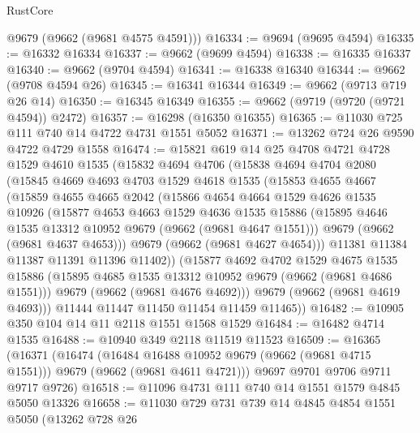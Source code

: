 \begin{lexlean}{RustCore}
\begin{coremodule}
      @9679
      (@9662 (@9681 @4575 @4591)))
@16334 := @9694 (@9695 @4594)
@16335 := @16332 @16334
@16337 := @9662 (@9699 @4594)
@16338 := @16335 @16337
@16340 := @9662 (@9704 @4594)
@16341 := @16338 @16340
@16344 := @9662 (@9708 @4594 @26)
@16345 := @16341 @16344
@16349 := @9662 (@9713 @719 @26 @14)
@16350 := @16345 @16349
@16355 := @9662 (@9719 (@9720 (@9721 @4594)) @2472)
@16357 := @16298 (@16350 @16355)
@16365 := @11030 @725 @111 @740 @14 @4722 @4731 @1551 @5052
@16371 := @13262 @724 @26 @9590 @4722 @4729 @1558
@16474 := @15821
    @619
    @14
    @25
    @4708
    @4721
    @4728
    @1529
    @4610
    @1535
    (@15832
      @4694
      @4706
      (@15838
        @4694
        @4704
        @2080
        (@15845
          @4669
          @4693
          @4703
          @1529
          @4618
          @1535
          (@15853
            @4655
            @4667
            (@15859
              @4655
              @4665
              @2042
              (@15866
                @4654
                @4664
                @1529
                @4626
                @1535
                @10926
                (@15877
                  @4653
                  @4663
                  @1529
                  @4636
                  @1535
                  @15886
                  (@15895 @4646 @1535 @13312 @10952 @9679 (@9662 (@9681 @4647 @1551)))
                  @9679
                  (@9662 (@9681 @4637 @4653)))
                @9679
                (@9662 (@9681 @4627 @4654)))
              @11381
              @11384
              @11387
              @11391
              @11396
              @11402))
          (@15877
            @4692
            @4702
            @1529
            @4675
            @1535
            @15886
            (@15895 @4685 @1535 @13312 @10952 @9679 (@9662 (@9681 @4686 @1551)))
            @9679
            (@9662 (@9681 @4676 @4692)))
          @9679
          (@9662 (@9681 @4619 @4693)))
        @11444
        @11447
        @11450
        @11454
        @11459
        @11465))
@16482 := @10905 @350 @104 @14 @11 @2118 @1551 @1568 @1529
@16484 := @16482 @4714 @1535
@16488 := @10940 @349 @2118 @11519 @11523
@16509 := @16365
    (@16371
      (@16474
        (@16484 @16488 @10952 @9679 (@9662 (@9681 @4715 @1551)))
        @9679
        (@9662 (@9681 @4611 @4721)))
      @9697
      @9701
      @9706
      @9711
      @9717
      @9726)
@16518 := @11096 @4731 @111 @740 @14 @1551 @1579 @4845 @5050 @13326
@16658 := @11030
    @729
    @731
    @739
    @14
    @4845
    @4854
    @1551
    @5050
    (@13262
      @728
      @26

\end{coremodule}
\end{lexlean}
